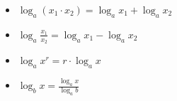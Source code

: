 \documentclass{article}
\newcounter{example}[section]
\newenvironment{example}[1][]{\refstepcounter{example}\par\medskip
   \noindent \textbf{Naloga~\theexample. #1} \rmfamily}{\medskip}
\newtheorem*{zgled}{Zgled}
\begin{document}
\begin{itemize}
    \item $\log_a (x_1 \cdot x_2) =\log_a x_1 + \log_a x_2$
    \item $\log_a \frac{x_1}{x_2} =\log_a x_1 - \log_a x_2$
    \item $\log_a x^r = r\cdot\log_a x$
    \item $\log_b x=\frac{\log_a x}{\log_a b}$
\end{itemize}

\end{document}
